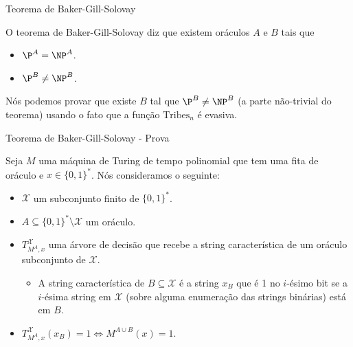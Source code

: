 \documentclass[landscape, 9pt]{beamer}
\newcommand{\binalph}{\{0, 1\}}
\newcommand{\Tribes}{\text{Tribes}}
\begin{document}

\begin{frame} {Teorema de Baker-Gill-Solovay}

O teorema de Baker-Gill-Solovay diz que existem oráculos $A$ e $B$ tais que

\begin{itemize}

	\item $\P^{A} = \NP^{A}$.
	
	\item $\P^{B} \neq \NP^{B}$.

\end{itemize}

Nós podemos provar que existe $B$ tal que $\P^{B} \neq \NP^{B}$ (a parte não-trivial do teorema) usando o fato que a função $\Tribes_{n}$ é evasiva.

\end{frame}


\begin{frame} {Teorema de Baker-Gill-Solovay - Prova}

Seja $M$ uma máquina de Turing de tempo polinomial que tem uma fita de oráculo e $x \in \binalph^{*}$. Nós consideramos o seguinte:

\begin{itemize}

	\item $\mathcal{X}$ um subconjunto finito de $\binalph^{*}$.
	
	\item $A \subseteq \binalph^{*} \setminus \mathcal{X}$ um oráculo.
	
	\item $T_{M^{A}, x}^{\mathcal{X}}$ uma árvore de decisão que recebe a string característica de um oráculo subconjunto de $\mathcal{X}$.
	
	\begin{itemize}
	
		\item A string característica de $B \subseteq \mathcal{X}$ é a string $x_{B}$ que é 1 no $i$-ésimo bit se a $i$-ésima string em $\mathcal{X}$ (sobre alguma enumeração das strings binárias) está em $B$.
	
	\end{itemize}
	
	\item $T_{M^{A}, x}^{\mathcal{X}}(x_{B}) = 1 \iff M^{A \cup B}(x) = 1$.

\end{itemize}

\end{frame}
\end{document}
